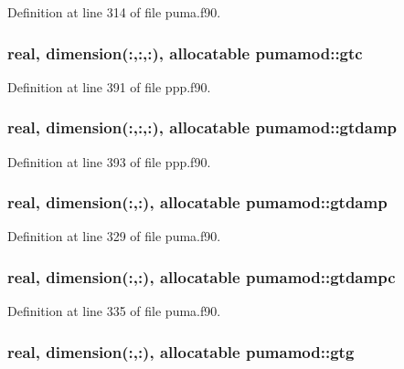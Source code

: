 \-Definition at line 314 of file puma.\-f90.

\hypertarget{classpumamod_acb21b0133fc9d543c9a472c65c1fc025}{
\subsubsection[{gtc}]{\setlength{\rightskip}{0pt plus 5cm}real, dimension(\-:,\-:,\-:), allocatable {\bf pumamod\-::gtc}}}
\label{classpumamod_acb21b0133fc9d543c9a472c65c1fc025}


\-Definition at line 391 of file ppp.\-f90.

\hypertarget{classpumamod_afde0b96dd53a26b1703595f64071516d}{
\subsubsection[{gtdamp}]{\setlength{\rightskip}{0pt plus 5cm}real, dimension(\-:,\-:,\-:), allocatable {\bf pumamod\-::gtdamp}}}
\label{classpumamod_afde0b96dd53a26b1703595f64071516d}


\-Definition at line 393 of file ppp.\-f90.

\hypertarget{classpumamod_a697a2f43424ec02c33ad0e069f60edd2}{
\subsubsection[{gtdamp}]{\setlength{\rightskip}{0pt plus 5cm}real, dimension(\-:,\-:), allocatable {\bf pumamod\-::gtdamp}}}
\label{classpumamod_a697a2f43424ec02c33ad0e069f60edd2}


\-Definition at line 329 of file puma.\-f90.

\hypertarget{classpumamod_ab154b81faaea8224202d205d5377ecb5}{
\subsubsection[{gtdampc}]{\setlength{\rightskip}{0pt plus 5cm}real, dimension(\-:,\-:), allocatable {\bf pumamod\-::gtdampc}}}
\label{classpumamod_ab154b81faaea8224202d205d5377ecb5}


\-Definition at line 335 of file puma.\-f90.

\hypertarget{classpumamod_ad349c2130e94459e9c8e90c4b4208876}{
\subsubsection[{gtg}]{\setlength{\rightskip}{0pt plus 5cm}real, dimension(\-:,\-:), allocatable {\bf pumamod\-::gtg}}}
\label{classpumamod_ad349c2130e94459e9c8e90c4b4208876}


